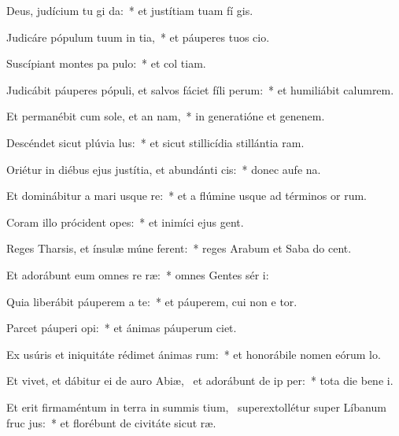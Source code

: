 \item Deus, judícium tu gi da:~* et justítiam tuam fí gis.
\item Judicáre pópulum tuum in tia,~* et páuperes tuos  cio.
\item Suscípiant montes pa pulo:~* et col tiam.
\item Judicábit páuperes pópuli, et salvos fáciet fíli perum:~* et humiliábit calumrem.
\item Et permanébit cum sole, et an nam,~* in generatióne et genenem.
\item Descéndet sicut plúvia  lus:~* et sicut stillicídia stillántia  ram.
\item Oriétur in diébus ejus justítia, et abundánti cis:~* donec aufe na.
\item Et dominábitur a mari usque  re:~* et a flúmine usque ad términos or rum.
\item Coram illo prócident opes:~* et inimíci ejus  gent.
\item Reges Tharsis, et ínsulæ múne ferent:~* reges Arabum et Saba do cent.
\item Et adorábunt eum omnes re ræ:~* omnes Gentes sér i:
\item Quia liberábit páuperem a te:~* et páuperem, cui non e tor.
\item Parcet páuperi  opi:~* et ánimas páuperum  ciet.
\item Ex usúris et iniquitáte rédimet ánimas rum:~* et honorábile nomen eórum  lo.
\item Et vivet, et dábitur ei de auro Abiæ,~\pscross{} et adorábunt de ip per:~* tota die bene i.
\item Et erit firmaméntum in terra in summis tium,~\pscross{} superextollétur super Líbanum fruc jus:~* et florébunt de civitáte sicut  ræ.
